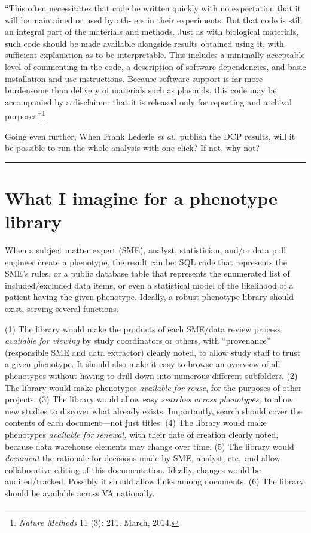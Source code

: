 \documentclass{tufte-handout}
\begin{document}
``This often necessitates that code be written quickly with no
expectation that it will be maintained or used by oth- ers in their
experiments. But that code is still an integral part of the materials
and methods. Just as with biological materials, such code should be
made available alongside results obtained using it, with sufficient
explanation as to be interpretable. This includes a minimally
acceptable level of commenting in the code, a description of software
dependencies, and basic installation and use instructions. Because
software support is far more burdensome than delivery of materials
such as plasmids, this code may be accompanied by a disclaimer that it
is released only for reporting and archival
purposes.''\footnote{\emph{Nature Methods} 11 (3): 211. March, 2014.}

Going even further, When Frank Lederle \emph{et al.}\ publish the DCP
results, will it be possible to run the whole analysis with one click?
If not, why not?

\noindent \rule{\textwidth}{1pt}

\section{What I imagine for a phenotype library}

When a subject matter expert (SME), analyst, statistician, and/or data
pull engineer create a phenotype, the result can be: SQL code that
represents the SME's rules, or a public database table that represents
the enumerated list of included/excluded data items, or even a
statistical model of the likelihood of a patient having the given
phenotype. Ideally, a robust phenotype library should exist, serving
several functions.

(1) The library would make the products of each SME/data review
process \emph{available for viewing} by study coordinators or others,
with ``provenance'' (responsible SME and data extractor) clearly
noted, to allow study staff to trust a given phenotype. It should also
make it easy to browse an overview of all phenotypes without having to
drill down into numerous different subfolders. (2) The library would
make phenotypes \emph{available for reuse}, for the purposes of other
projects. (3) The library would allow easy \emph{searches across
  phenotypes,} to allow new studies to discover what already exists.
Importantly, search should cover the contents of each document---not
just titles. (4) The library would make phenotypes \emph{available for
  renewal,} with their date of creation clearly noted, because data
warehouse elements may change over time. (5) The library would
\emph{document} the rationale for decisions made by SME, analyst,
etc.\ and allow collaborative editing of this documentation. Ideally,
changes would be audited/tracked. Possibly it should allow links among
documents. (6) The library should be available across VA nationally.
\end{document}
